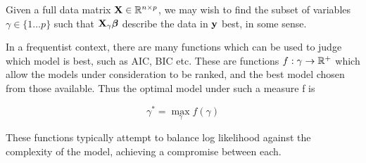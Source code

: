 \documentclass{article}[12pt]
\begin{document}
Given a full data matrix ${\bf X} \in {\mathbb{R}}^{n \times p}$, we may wish to find the subset of variables
$\gamma \in \{ 1 \ldots p \}$ such that ${\bf X}_\gamma {\boldsymbol\beta}$ describe the data in ${\bf y}$ best, in some
sense.

In a frequentist context, there are many functions which can be used to judge which model is best,
such as AIC, BIC etc. These are functions $f: \gamma \to {\mathbb{R}}^+$ which allow the models under consideration to
be ranked, and the best model chosen from those available. Thus the optimal model under such a measure
f is

$$
\gamma^* = \max_\gamma f(\gamma)
$$

These functions typically attempt to balance log likelihood against the complexity of the model, achieving
a compromise between each.



\end{document}
